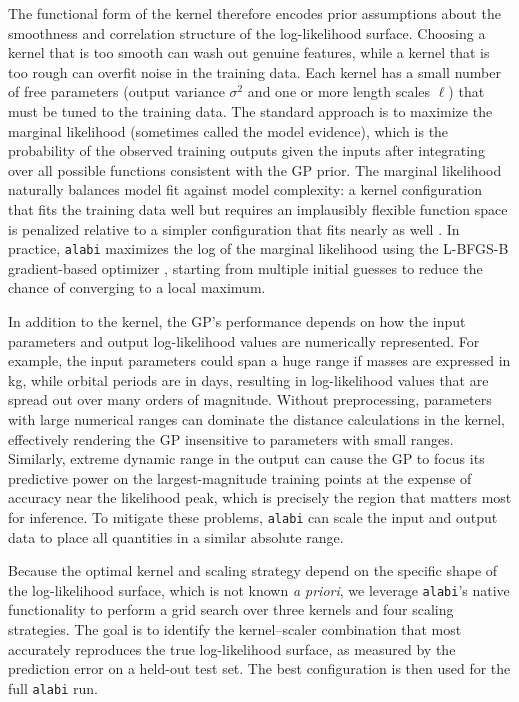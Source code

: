 \documentclass[preprint]{aastex631}
\def\alabi{\texttt{\footnotesize{alabi}}\xspace}
\begin{document}
The functional form of the kernel
therefore encodes prior assumptions about the smoothness and
correlation structure of the log-likelihood surface. Choosing a kernel
that is too smooth can wash out genuine features, while a kernel that
is too rough can overfit noise in the training data. Each kernel has a
small number of free parameters (output variance $\sigma^{2}$ and
one or more length scales $\ell$) that must be tuned to the training data. The standard approach is to
maximize the marginal likelihood (sometimes called the model
evidence), which is the probability of the observed training outputs
given the inputs after integrating over all possible functions
consistent with the GP prior. The marginal likelihood naturally
balances model fit against model complexity: a kernel configuration
that fits the training data well but requires an implausibly flexible
function space is penalized relative to a simpler configuration that
fits nearly as well \citep{Rasmussen06}. In practice,
\texttt{alabi} maximizes the log of the marginal likelihood using the
L-BFGS-B gradient-based optimizer \citep{Byrd95}, starting from
multiple initial guesses to reduce the chance of converging to a local
maximum.

In addition to the kernel, the GP's performance depends on how the input
parameters and output log-likelihood values are numerically
represented. For example, the input parameters could span a huge range if masses are expressed in kg, while orbital periods are in days, resulting in log-likelihood values 
that are spread out over many orders of magnitude. Without preprocessing, parameters
with large numerical ranges can dominate the distance calculations in
the kernel, effectively rendering the GP insensitive to parameters
with small ranges. Similarly, extreme dynamic range in the output can
cause the GP to focus its predictive power on the largest-magnitude
training points at the expense of accuracy near the likelihood peak,
which is precisely the region that matters most for inference. To mitigate these problems, \alabi can scale the input and output data to place all quantities in a similar absolute range.

Because the optimal kernel and scaling strategy depend on the specific
shape of the log-likelihood surface, which is not known \emph{a
priori}, we leverage \alabi's native functionality to perform a grid search over three kernels and
four scaling strategies. The goal is to
identify the kernel--scaler combination that most accurately
reproduces the true log-likelihood surface, as measured by the
prediction error on a held-out test set. The best configuration is
then used for the full \alabi run.
\end{document}
